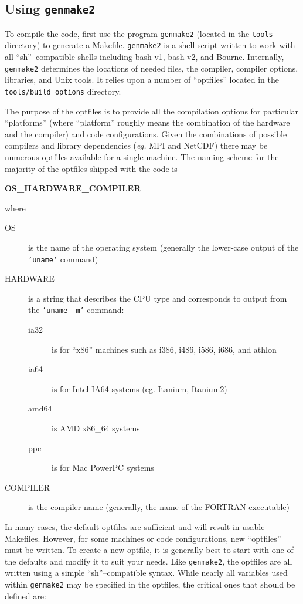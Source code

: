 \subsection{Using \texttt{genmake2}}
\label{sect:genmake}

To compile the code, first use the program \texttt{genmake2} (located
in the \texttt{tools} directory) to generate a Makefile.
\texttt{genmake2} is a shell script written to work with all
``sh''--compatible shells including bash v1, bash v2, and Bourne.
Internally, \texttt{genmake2} determines the locations of needed
files, the compiler, compiler options, libraries, and Unix tools.  It
relies upon a number of ``optfiles'' located in the
\texttt{tools/build\_options} directory.

The purpose of the optfiles is to provide all the compilation options
for particular ``platforms'' (where ``platform'' roughly means the
combination of the hardware and the compiler) and code configurations.
Given the combinations of possible compilers and library dependencies
({\it eg.}  MPI and NetCDF) there may be numerous optfiles available
for a single machine.  The naming scheme for the majority of the
optfiles shipped with the code is
\begin{center}
  {\bf OS\_HARDWARE\_COMPILER }
\end{center}
where
\begin{description}
\item[OS] is the name of the operating system (generally the
  lower-case output of the {\tt 'uname'} command)
\item[HARDWARE] is a string that describes the CPU type and
  corresponds to output from the  {\tt 'uname -m'} command:
  \begin{description}
  \item[ia32] is for ``x86'' machines such as i386, i486, i586, i686,
    and athlon
  \item[ia64] is for Intel IA64 systems (eg. Itanium, Itanium2)
  \item[amd64] is AMD x86\_64 systems
  \item[ppc] is for Mac PowerPC systems
  \end{description}
\item[COMPILER] is the compiler name (generally, the name of the
  FORTRAN executable)
\end{description}

In many cases, the default optfiles are sufficient and will result in
usable Makefiles.  However, for some machines or code configurations,
new ``optfiles'' must be written. To create a new optfile, it is
generally best to start with one of the defaults and modify it to suit
your needs.  Like \texttt{genmake2}, the optfiles are all written
using a simple ``sh''--compatible syntax.  While nearly all variables
used within \texttt{genmake2} may be specified in the optfiles, the
critical ones that should be defined are:


